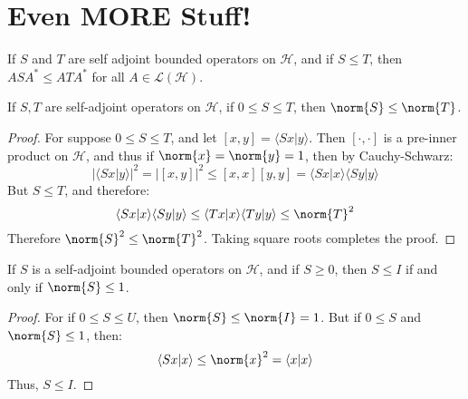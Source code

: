 \documentclass[crop=false,class=book,oneside]{standalone}                      %
\begin{document}
    \section{Even MORE Stuff!}
        \begin{theorem}
            If $S$ and $T$ are self adjoint bounded operators
            on $\mathcal{H}$, and if $S\leq{T}$, then
            $ASA^{*}\leq{A}TA^{*}$ for all
            $A\in\mathscr{L}(\mathcal{H})$.
        \end{theorem}
        \begin{theorem}
            If $S,T$ are self-adjoint operators on $\mathcal{H}$,
            if $0\leq{S}\leq{T}$, then $\norm{S}\leq\norm{T}$.
        \end{theorem}
        \begin{proof}
            For suppose $0\leq{S}\leq{T}$, and let
            $[x,y]=\langle{Sx|y}\rangle$. Then $[\cdot,\cdot]$
            is a pre-inner product on $\mathcal{H}$, and thus
            if $\norm{x}=\norm{y}=1$, then by Cauchy-Schwarz:
            \begin{equation}
                |\langle{Sx|y}\rangle|^{2}=|[x,y]|^{2}
                \leq[x,x][y,y]=
                \langle{Sx|x}\rangle\langle{Sy|y}\rangle
            \end{equation}
            But $S\leq{T}$, and therefore:
            \begin{equation}
                \langle{Sx|x}\rangle\langle{Sy|y}\rangle
                \leq\langle{Tx|x}\rangle\langle{Ty|y}\rangle
                \leq\norm{T}^{2}
            \end{equation}
            Therefore $\norm{S}^{2}\leq\norm{T}^{2}$. Taking
            square roots completes the proof.
        \end{proof}
        \begin{theorem}
            If $S$ is a self-adjoint bounded operators on
            $\mathcal{H}$, and if $S\geq{0}$, then
            $S\leq{I}$ if and only if $\norm{S}\leq{1}$.
        \end{theorem}
        \begin{proof}
            For if $0\leq{S}\leq{U}$, then
            $\norm{S}\leq\norm{I}=1$. But if $0\leq{S}$ and
            $\norm{S}\leq{1}$, then:
            \begin{equation}
                \langle{Sx|x}\rangle\leq\norm{x}^{2}=
                \langle{x|x}\rangle
            \end{equation}
            Thus, $S\leq{I}$.
        \end{proof}
\end{document}
